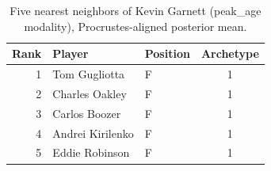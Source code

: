 \begin{table}[htbp]
  \centering\small
  \begin{tabular}{rllc}
    \toprule
    Rank & Player & Position & Archetype \\
    \midrule
    1 & Tom Gugliotta & F & 1 \\
    2 & Charles Oakley & F & 1 \\
    3 & Carlos Boozer & F & 1 \\
    4 & Andrei Kirilenko & F & 1 \\
    5 & Eddie Robinson & F & 1 \\
    \bottomrule
  \end{tabular}
  \caption{Five nearest neighbors of Kevin Garnett (peak_age modality), Procrustes-aligned posterior mean.}
  \label{tab:Kevin_Garnett_neighbors_peak_age}
\end{table}

